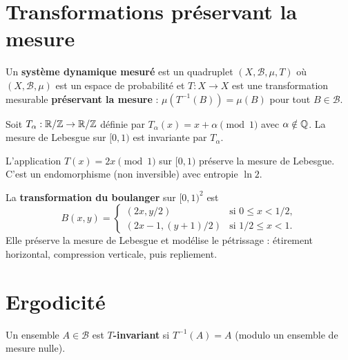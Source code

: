 \section{Transformations pr\'eservant la mesure}

\begin{definition}
Un \textbf{syst\`eme dynamique mesur\'e} est un quadruplet
$(X, \mathcal{B}, \mu, T)$ o\`u $(X, \mathcal{B}, \mu)$ est un espace de
probabilit\'e et $T : X \to X$ est une transformation mesurable
\textbf{pr\'eservant la mesure} :
$\mu(T^{-1}(B)) = \mu(B)$ pour tout $B \in \mathcal{B}$.
\end{definition}

\begin{exemple}
Soit $T_\alpha : \mathbb{R}/\mathbb{Z} \to \mathbb{R}/\mathbb{Z}$ d\'efinie par $T_\alpha(x) = x + \alpha \pmod{1}$
avec $\alpha \notin \mathbb{Q}$. La mesure de Lebesgue sur $[0, 1)$ est invariante par
$T_\alpha$.
\end{exemple}

\begin{exemple}
L'application $T(x) = 2x \pmod{1}$ sur $[0, 1)$ pr\'eserve la mesure de
Lebesgue. C'est un endomorphisme (non inversible) avec entropie $\ln 2$.
\end{exemple}

\begin{exemple}
La \textbf{transformation du boulanger} sur $[0,1)^2$ est
\[
    B(x, y) = \begin{cases}
    (2x, y/2) & \text{si } 0 \leq x < 1/2, \\
    (2x - 1, (y+1)/2) & \text{si } 1/2 \leq x < 1.
    \end{cases}
\]
Elle pr\'eserve la mesure de Lebesgue et mod\'elise le p\'etrissage :
\'etirement horizontal, compression verticale, puis repliement.
\end{exemple}

\section{Ergodicit\'e}

\begin{definition}
Un ensemble $A \in \mathcal{B}$ est \textbf{$T$-invariant} si
$T^{-1}(A) = A$ (modulo un ensemble de mesure nulle).
\end{definition}

